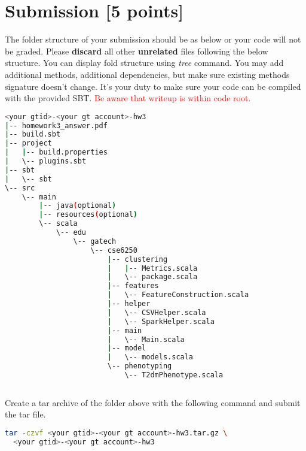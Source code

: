 \documentclass[12pt]{article}
\begin{document}
\section{Submission [5 points]}
The folder structure of your submission should be as below or your code will not be graded. Please \textbf{discard} all other \textbf{unrelated} files following the below structure. You can display fold structure using \textit{tree} command. You may add additional methods, additional dependencies, but make sure  existing methods signature doesn't change. It's your duty to make sure your code can be compiled with the provided SBT. \textcolor{red}{Be aware that writeup is within code root.} \\

\begin{lstlisting}[language=bash,frame=single]
<your gtid>-<your gt account>-hw3
|-- homework3_answer.pdf
|-- build.sbt
|-- project
|   |-- build.properties
|   \-- plugins.sbt
|-- sbt
|   \-- sbt
\-- src
    \-- main
        |-- java(optional)
        |-- resources(optional)
        \-- scala
            \-- edu
                \-- gatech
                    \-- cse6250
                        |-- clustering
                        |   |-- Metrics.scala
                        |   \-- package.scala
                        |-- features
                        |   \-- FeatureConstruction.scala
                        |-- helper
                        |   \-- CSVHelper.scala
                        |   \-- SparkHelper.scala
                        |-- main
                        |   \-- Main.scala
                        |-- model
                        |   \-- models.scala
                        \-- phenotyping
                            \-- T2dmPhenotype.scala
   
\end{lstlisting}
Create a tar archive of the folder above with the following command and submit the tar file.
\begin{lstlisting}[language=bash,frame=single]
tar -czvf <your gtid>-<your gt account>-hw3.tar.gz \
  <your gtid>-<your gt account>-hw3
\end{lstlisting}
\end{document}
